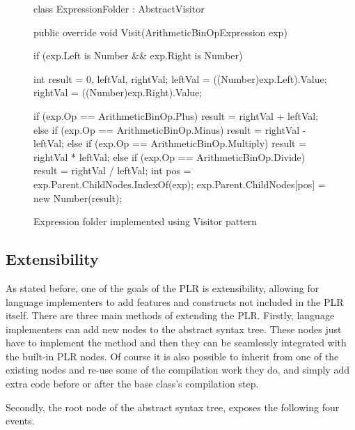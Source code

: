	\begin{figure}[h!]
	\begin{csharp}
class ExpressionFolder : AbstractVisitor{

  public override void Visit(ArithmeticBinOpExpression exp) {
    if (exp.Left is Number && exp.Right is Number) {
      int result = 0, leftVal, rightVal;
      leftVal = ((Number)exp.Left).Value;
      rightVal = ((Number)exp.Right).Value;
		
      if (exp.Op == ArithmeticBinOp.Plus) {
        result = rightVal + leftVal;
      } else if (exp.Op == ArithmeticBinOp.Minus) {
        result = rightVal - leftVal;
      } else if (exp.Op == ArithmeticBinOp.Multiply) {
        result = rightVal * leftVal;
      } else if (exp.Op == ArithmeticBinOp.Divide) {
        result = rightVal / leftVal;
      }
      int pos = exp.Parent.ChildNodes.IndexOf(exp);
      exp.Parent.ChildNodes[pos] = new Number(result);
    }
  }
}
\end{csharp}
\caption{Expression folder implemented using Visitor pattern} \label{fig:expression_folder}
\end{figure}

\subsection{Extensibility}
	
	As stated before, one of the goals of the PLR is extensibility, allowing
	for language implementers to add features and constructs not included in
	the PLR itself. There are three main methods of extending the PLR. Firstly,
	language implementers can add new nodes to the abstract syntax tree. These
	nodes just have to implement the  method and then they can
	be seamlessly integrated with the built-in PLR nodes. Of course it is also
	possible to inherit from one of the existing nodes and re-use some
	of the compilation work they do, and simply add extra code before or after
	the base class's compilation step. 
	
	Secondly, the root node of the abstract	syntax tree,  
	exposes the following four events. 
	
